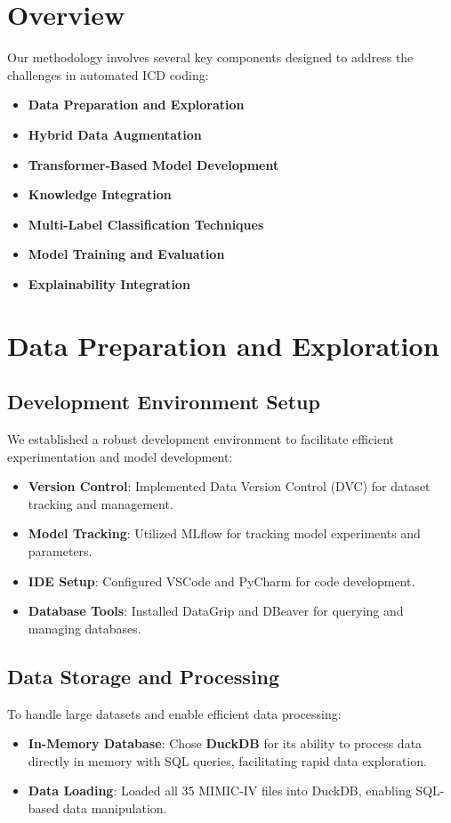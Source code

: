 \documentclass[12pt,a4paper]{report}
\begin{document}
\section{Overview}
Our methodology involves several key components designed to address the challenges in automated ICD coding:
\begin{itemize}
    \item \textbf{Data Preparation and Exploration}
    \item \textbf{Hybrid Data Augmentation}
    \item \textbf{Transformer-Based Model Development}
    \item \textbf{Knowledge Integration}
    \item \textbf{Multi-Label Classification Techniques}
    \item \textbf{Model Training and Evaluation}
    \item \textbf{Explainability Integration}
\end{itemize}

\section{Data Preparation and Exploration}

\subsection{Development Environment Setup}
We established a robust development environment to facilitate efficient experimentation and model development:
\begin{itemize}
    \item \textbf{Version Control}: Implemented Data Version Control (DVC) for dataset tracking and management.
    \item \textbf{Model Tracking}: Utilized MLflow for tracking model experiments and parameters.
    \item \textbf{IDE Setup}: Configured VSCode and PyCharm for code development.
    \item \textbf{Database Tools}: Installed DataGrip and DBeaver for querying and managing databases.
\end{itemize}

\subsection{Data Storage and Processing}
To handle large datasets and enable efficient data processing:
\begin{itemize}
    \item \textbf{In-Memory Database}: Chose \textbf{DuckDB} for its ability to process data directly in memory with SQL queries, facilitating rapid data exploration.
    \item \textbf{Data Loading}: Loaded all 35 MIMIC-IV files into DuckDB, enabling SQL-based data manipulation.
\end{itemize}
\end{document}
